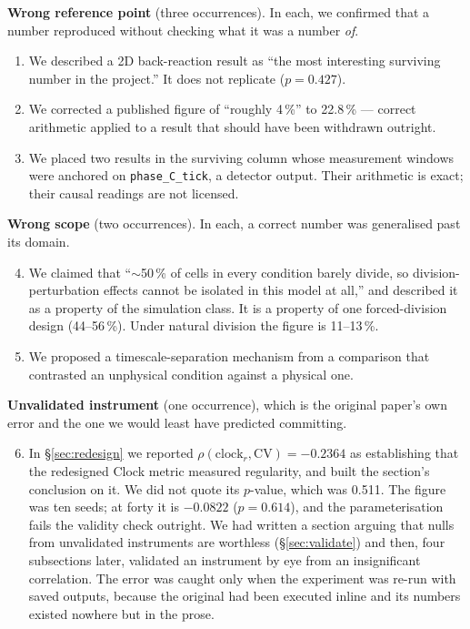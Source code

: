 \documentclass[11pt,letterpaper]{article}
\begin{document}
\textbf{Wrong reference point} (three occurrences). In each, we
confirmed that a number reproduced without checking what it was a number
\emph{of}.
\begin{enumerate}
\item We described a 2D back-reaction result as ``the most interesting
      surviving number in the project.'' It does not replicate
      ($p = 0.427$).
\item We corrected a published figure of ``roughly 4\,\%'' to 22.8\,\% ---
      correct arithmetic applied to a result that should have been
      withdrawn outright.
\item We placed two results in the surviving column whose measurement
      windows were anchored on \texttt{phase\_C\_tick}, a detector
      output. Their arithmetic is exact; their causal readings are not
      licensed.
\end{enumerate}

\textbf{Wrong scope} (two occurrences). In each, a correct number was
generalised past its domain.
\begin{enumerate}\setcounter{enumi}{3}
\item We claimed that ``$\sim$50\,\% of cells in every condition barely
      divide, so division-perturbation effects cannot be isolated in
      this model at all,'' and described it as a property of the
      simulation class. It is a property of one forced-division design
      (44--56\,\%). Under natural division the figure is 11--13\,\%.
\item We proposed a timescale-separation mechanism from a comparison
      that contrasted an unphysical condition against a physical one.
\end{enumerate}

\textbf{Unvalidated instrument} (one occurrence), which is the original
paper's own error and the one we would least have predicted committing.
\begin{enumerate}\setcounter{enumi}{5}
\item In \S\ref{sec:redesign} we reported
      $\rho(\mathrm{clock}_r, \mathrm{CV}) = -0.2364$ as establishing
      that the redesigned Clock metric measured regularity, and built
      the section's conclusion on it. We did not quote its $p$-value,
      which was 0.511. The figure was ten seeds; at forty it is
      $-0.0822$ ($p = 0.614$), and the parameterisation fails the
      validity check outright. We had written a section arguing that
      nulls from unvalidated instruments are worthless
      (\S\ref{sec:validate}) and then, four subsections later, validated
      an instrument by eye from an insignificant correlation. The error
      was caught only when the experiment was re-run with saved outputs,
      because the original had been executed inline and its numbers
      existed nowhere but in the prose.
\end{enumerate}
\end{document}
